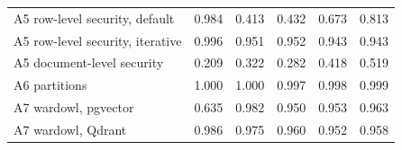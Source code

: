 \begin{table}[t]
\begin{tabular}{@{}lrrrrr@{}}
A5 row-level security, default & 0.984 & 0.413 & 0.432 & 0.673 & 0.813 \\
A5 row-level security, iterative & 0.996 & 0.951 & 0.952 & 0.943 & 0.943 \\
A5 document-level security & 0.209 & 0.322 & 0.282 & 0.418 & 0.519 \\
A6 partitions & 1.000 & 1.000 & 0.997 & 0.998 & 0.999 \\
A7 wardowl, pgvector & 0.635 & 0.982 & 0.950 & 0.953 & 0.963 \\
A7 wardowl, Qdrant & 0.986 & 0.975 & 0.960 & 0.952 & 0.958 \\
\bottomrule
\end{tabular}
\end{table}
